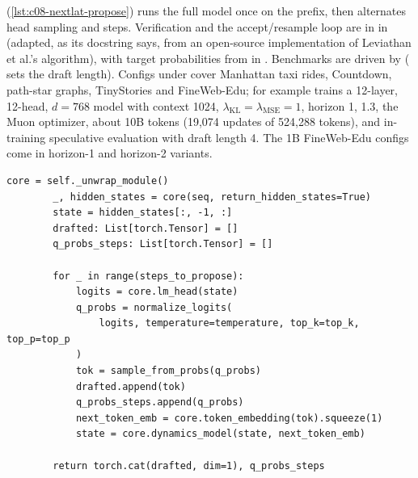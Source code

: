 \begin{implnote}[title={In the code: drafting, verification, configs}]
 (\cref{lst:c08-nextlat-propose}) runs the full model once on the
prefix, then alternates head sampling and  steps. Verification and the
accept/resample loop are in  in
 (adapted, as its docstring says,
from an open-source implementation of Leviathan et al.'s algorithm), with target probabilities from
 in .
Benchmarks are driven by  ( sets the draft
length). Configs under  cover Manhattan taxi rides,
Countdown, path-star graphs, TinyStories and FineWeb-Edu; for example
 trains a 12-layer, 12-head, $d=768$ model with
context 1024, $\lambda_{\mathrm{KL}}=\lambda_{\mathrm{MSE}}=1$, horizon 1,  1.3, the
Muon optimizer, about 10B tokens (19,074 updates of 524,288 tokens), and in-training speculative
evaluation with draft length 4. The 1B FineWeb-Edu configs come in horizon-1 and horizon-2 variants.
\end{implnote}

\begin{lstlisting}[caption={Excerpt from \texttt{repos/\allowbreak JaydenTeoh\_\_NextLat/\allowbreak models/\allowbreak model\_nextlat.py} (\texttt{NextLat.speculative\_propose}).},label={lst:c08-nextlat-propose}]
        core = self._unwrap_module()
        _, hidden_states = core(seq, return_hidden_states=True)
        state = hidden_states[:, -1, :]
        drafted: List[torch.Tensor] = []
        q_probs_steps: List[torch.Tensor] = []

        for _ in range(steps_to_propose):
            logits = core.lm_head(state)
            q_probs = normalize_logits(
                logits, temperature=temperature, top_k=top_k, top_p=top_p
            )
            tok = sample_from_probs(q_probs)
            drafted.append(tok)
            q_probs_steps.append(q_probs)
            next_token_emb = core.token_embedding(tok).squeeze(1)
            state = core.dynamics_model(state, next_token_emb)

        return torch.cat(drafted, dim=1), q_probs_steps
\end{lstlisting}

